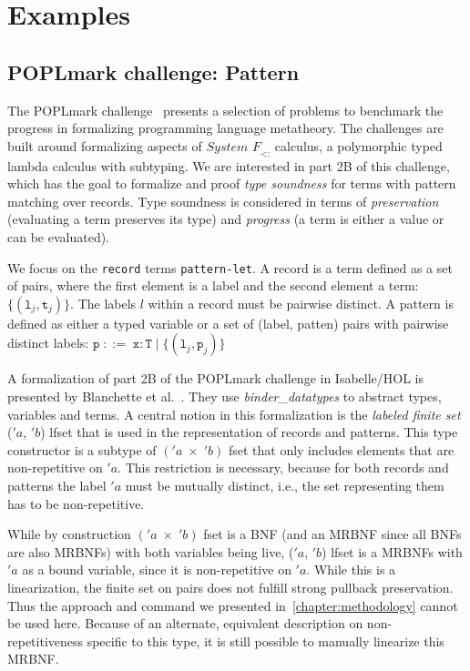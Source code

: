 
\chapter{Examples}
\label{chapter:examples}

  \section{POPLmark challenge: Pattern}
    The POPLmark challenge~\cite{aydemir2005mechanized} presents a selection of problems to benchmark the progress in formalizing programming language metatheory. The challenges are built around formalizing aspects of $\textit{System F}_\textit{<:}$ calculus, a polymorphic typed lambda calculus with subtyping. We are interested in part 2B of this challenge, which has the goal to formalize and proof \textit{type soundness} for terms with pattern matching over records. Type soundness is considered in terms of \textit{preservation} (evaluating a term preserves its type) and \textit{progress} (a term is either a value or can be evaluated).

    We focus on the \texttt{record} terms \texttt{pattern-let}. %
    A record is a term defined as a set of pairs, where the first element is a label and the second element a term: $\{(\texttt{l}_j, \texttt{t}_j)\}$. The labels $l$ within a record must be pairwise distinct.
    A pattern is defined as either a typed variable or a set of (label, patten) pairs with pairwise distinct labels:
    $\texttt{p}\; ::=\; \texttt{x}:\texttt{T}\; |\; \{(\texttt{l}_j, \texttt{p}_j)\}$

    A formalization of part 2B of the POPLmark challenge in Isabelle/HOL is presented by Blanchette et al.~\cite{blanchette2019bindings}. They use \textit{binder\_datatypes} to abstract types, variables and terms. A central notion in this formalization is the \textit{labeled finite set} \textsf{($'a$, $'b$) lfset} that is used in the representation of records and patterns. This type constructor is a subtype of \textsf{$('a\; \times\; 'b)$ fset} that only includes elements that are non-repetitive on $'a$. This restriction is necessary, because for both records and patterns the label $'a$ must be mutually distinct, i.e., the set representing them has to be non-repetitive.

    While by construction \textsf{$('a\; \times\; 'b)$ fset} is a \ac{BNF} (and an \ac{MRBNF} since all \acp{BNF} are also \acp{MRBNF}) with both variables being live, \textsf{($'a$, $'b$) lfset} is a \acp{MRBNF} with $'a$ as a bound variable, since it is non-repetitive on $'a$.
    While this is a linearization, the finite set on pairs does not fulfill strong pullback preservation. Thus the approach and command we presented in~\autoref{chapter:methodology} cannot be used here. Because of an alternate, equivalent description on non-repetitiveness specific to this type, it is still possible to manually linearize this \ac{MRBNF}.

